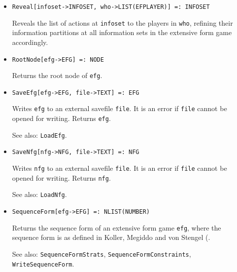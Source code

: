 \begin{itemize}
\item{}
\protect \large \begin{verbatim}
Reveal[infoset->INFOSET, who->LIST(EFPLAYER)] =: INFOSET 
\end{verbatim}\normalsize

\bd
Reveals the list of actions at \verb+infoset+ to the players in \verb+who+,
refining their information partitions at
all information sets in the extensive form game accordingly.  
\ed

\item{}
\protect \large \begin{verbatim}
RootNode[efg->EFG] =: NODE 
\end{verbatim}\normalsize

\bd
Returns the root node of \verb+efg+.
\ed


\item{}
\protect \large \begin{verbatim}
SaveEfg[efg->EFG, file->TEXT] =: EFG 
\end{verbatim}\normalsize

\bd
Writes \verb+efg+ to an external savefile \verb+file+.  It is an error
if \verb+file+ cannot be opened for writing.  Returns \verb+efg+.
\item [See also:] \verb+LoadEfg+.
\ed

\item{}
\protect \large \begin{verbatim}
SaveNfg[nfg->NFG, file->TEXT] =: NFG 
\end{verbatim}\normalsize

\bd
Writes \verb+nfg+ to an external savefile \verb+file+.  It is an
error if \verb+file+ cannot be opened for writing.  Returns \verb+nfg+.
\item [See also:] \verb+LoadNfg+.
\ed


\item{}
\protect \large \begin{verbatim} 
SequenceForm[efg->EFG] =: NLIST(NUMBER)
\end{verbatim}\normalsize

\bd
Returns the sequence form of an extensive form game 
\verb+efg+, where the sequence form is as defined in Koller,
Megiddo and von Stengel (\cite{KolMegSte:94}.
\item [See also:] \verb+SequenceFormStrats+,
\verb+SequenceFormConstraints+, \verb+WriteSequenceForm+.
\ed


\end{itemize}
